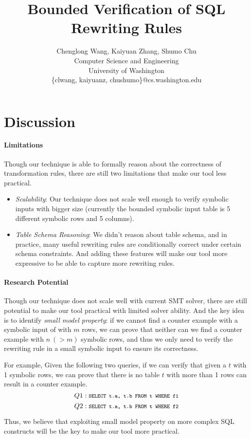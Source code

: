 \documentclass[10pt]{article}
\newcommand{\code}[1]{\texttt{\footnotesize #1}}
\begin{document}
\title{Bounded Verification of SQL Rewriting Rules}
\author{Chenglong Wang, Kaiyuan Zhang, Shumo Chu \\  
       Computer Science and Engineering\\ 
       University of Washington \\ 
       \{clwang, kaiyuanz, chushumo\}@cs.washington.edu  }
\date{}
\maketitle









\section{Discussion}
\paragraph{Limitations} Though our technique is able to formally reason about the correctness of transformation rules, there are still two limitations that make our tool less practical.
\begin{itemize}
\item \emph{Scalability}: Our technique does not scale well enough to verify symbolic inputs with bigger size (currently the bounded symbolic input table is 5 different symbolic rows and 5 columns).
\item \emph{Table Schema Reasoning}: We didn't reason about table schema, and in practice, many useful rewriting rules are conditionally correct under certain schema constraints. And adding these features will make our tool more expressive to be able to capture more rewriting rules.
\end{itemize} 

\paragraph{Research Potential} Though our technique does not scale well with current SMT solver, there are still potential to make our tool practical with limited solver ability. And the key idea is to identify \emph{small model property}: if we cannot find a counter example with a symbolic input of with $m$ rows, we can prove that neither can we find a counter example with $n~(>m)$ symbolic rows, and thus we only need to verify the rewriting rule in a small symbolic input to ensure its correctness.

For example, Given the following two queries, if we can verify that given a $t$ with 1 symbolic rows, we can prove that there is no table $t$ with more than 1 rows can result in a counter example.
$$Q1: \code{SELECT t.a, t.b FROM t WHERE f1}$$
$$Q2: \code{SELECT t.a, t.b FROM t WHERE f2}$$

Thus, we believe that exploiting small model property on more complex SQL constructs will be the key to make our tool more practical.




\end{document}
